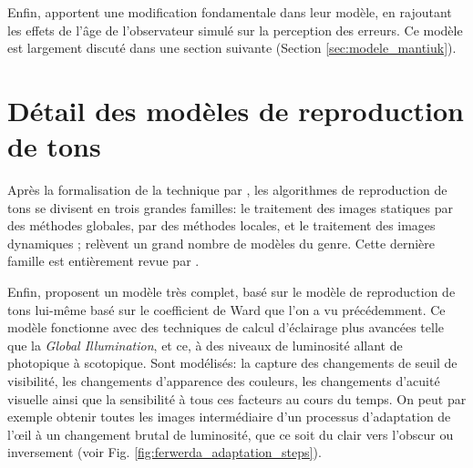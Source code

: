 	\par Enfin, \citep{mantiuk_human_2015} apportent une modification fondamentale dans leur modèle, en rajoutant les effets de l'âge de l'observateur simulé sur la perception des erreurs. Ce modèle est largement discuté dans une section suivante (Section \ref{sec:modele_mantiuk}).
	
	\section{Détail des modèles de reproduction de tons}
	\par Après la formalisation de la technique par \citep{rushmeier_comparing_1995}, les algorithmes de reproduction de tons se divisent en trois grandes familles: le traitement des images statiques par des méthodes globales, par des méthodes locales, et le traitement des images dynamiques ; \citep{moreau_traite_2006} relèvent un grand nombre de modèles du genre. Cette dernière famille est entièrement revue par \citep{drago_perceptual_2003}.
	
	\par Enfin, \citep{ferwerda_model_1996} proposent un modèle très complet, basé sur le modèle de reproduction de tons lui-même basé sur le coefficient de Ward que l'on a vu précédemment. Ce modèle fonctionne avec des techniques de calcul d'éclairage plus avancées telle que la \textit{Global Illumination}, et ce, à des niveaux de luminosité allant de photopique à scotopique. Sont modélisés: la capture des changements de seuil de visibilité, les changements d'apparence des couleurs, les changements d'acuité visuelle ainsi que la sensibilité à tous ces facteurs au cours du temps. On peut par exemple obtenir toutes les images intermédiaire d'un processus d'adaptation de l'œil à un changement brutal de luminosité, que ce soit du clair vers l'obscur ou inversement (voir Fig. \ref{fig:ferwerda_adaptation_steps}).
	

